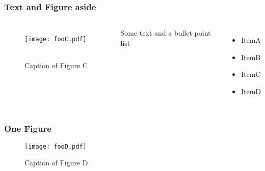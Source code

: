 \begin{frame}
        \frametitle{Text and Figure aside}
        \begin{columns}[]
                        \centering
                        \begin{figure}
                                \texttt{[image: fooC.pdf]} \
                                \caption{Caption of Figure C}
                        \end{figure}
                        Some text and a bullet point list
                        \begin{itemize}
                                \item ItemA
                                \item ItemB
                                \item ItemC
                                \item ItemD
                        \end{itemize}
        \end{columns}
\end{frame}

\begin{frame}
        \frametitle{One Figure}
        \bigskip
        \begin{figure}
                \texttt{[image: fooD.pdf]}
                \caption{Caption of Figure D}
        \end{figure}
\end{frame}

